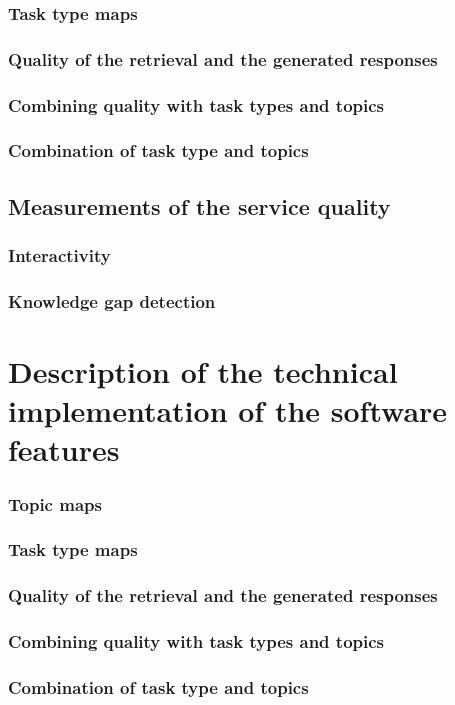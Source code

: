 \documentclass[
	english,
	ruledheaders=section,%
	class=report,%
	thesis={type=bachelor},%
	accentcolor=1b,%
	custommargins=true,%
	marginpar=false,%
	parskip=half-,%
	fontsize=11pt,%
	DIV=14,
]{tudapub}
\begin{document}
\subsubsection{Task type maps}
\subsubsection{Quality of the retrieval and the generated responses}
\subsubsection{Combining quality with task types and topics}
\subsubsection{Combination of task type and topics}
\subsection{Measurements of the service quality}
\subsubsection{Interactivity}
\subsubsection{Knowledge gap detection}
\section{Description of the technical implementation of the software features}
\subsubsection{Topic maps}
\subsubsection{Task type maps}
\subsubsection{Quality of the retrieval and the generated responses}
\subsubsection{Combining quality with task types and topics}
\subsubsection{Combination of task type and topics}
\end{document}
